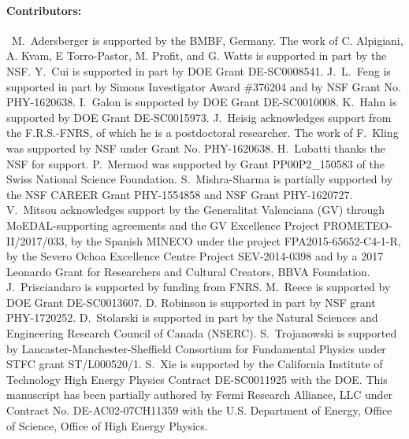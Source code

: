 \paragraph{Contributors:}~M.~Adersberger is supported by the BMBF, Germany. The work of C. Alpigiani, A. Kvam, E Torro-Pastor, M. Profit, and G. Watts is supported in part by the NSF. Y.~Cui is supported in part by DOE Grant DE-SC0008541. J.~L.~Feng is supported in part by Simons Investigator Award \#376204 and by NSF Grant No. PHY-1620638. I.~Galon is supported by DOE Grant DE-SC0010008. K.~Hahn is supported by DOE Grant DE-SC0015973. J.~Heisig acknowledges support from the F.R.S.-FNRS, of which he is a postdoctoral researcher. The work of F.~Kling was supported by NSF under Grant No. PHY-1620638. H.~Lubatti thanks the NSF for support. P.~Mermod was supported by Grant PP00P2\_150583 of the Swiss National Science Foundation. S.~Mishra-Sharma is partially supported by the NSF CAREER Grant PHY-1554858 and NSF Grant PHY-1620727. V.~Mitsou acknowledges support by the Generalitat Valenciana (GV) through MoEDAL-supporting agreements and the GV Excellence Project PROMETEO-II/2017/033, by the Spanish MINECO under the project FPA2015-65652-C4-1-R, by the Severo Ochoa Excellence Centre Project SEV-2014-0398 and by a 2017 Leonardo Grant for Researchers and Cultural Creators, BBVA Foundation. J.~Prisciandaro is supported by funding from FNRS. M.~Reece is supported by DOE Grant DE-SC0013607. D. Robinson is supported in part by NSF grant PHY-1720252. D.~Stolarski is supported in part by the Natural Sciences and Engineering Research Council of Canada (NSERC). S.~Trojanowski is supported by Lancaster-Manchester-Sheffield Consortium for Fundamental Physics under STFC grant ST/L000520/1. S.~Xie is supported by the California Institute of Technology High Energy Physics Contract DE-SC0011925 with the DOE. This manuscript has been partially authored by Fermi Research Alliance, LLC under Contract No. DE-AC02-07CH11359 with the U.S. Department of Energy, Office of Science, Office of High Energy Physics.\\



